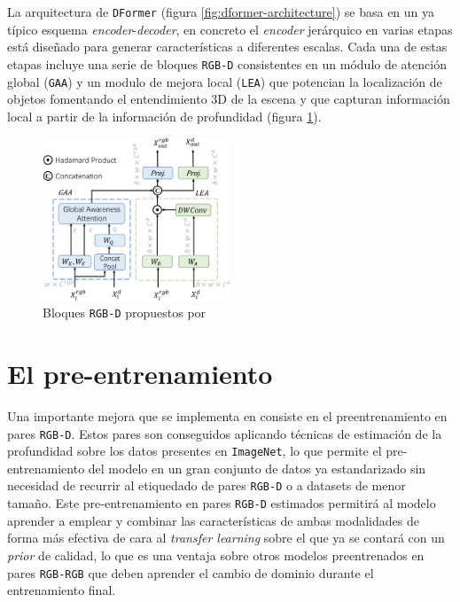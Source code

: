 \documentclass[12pt,a4paper]{report}
\begin{document}
La arquitectura de \texttt{DFormer} (figura \ref{fig:dformer-architecture}) se basa en un ya típico esquema \textit{encoder}-\textit{decoder}, en concreto el \textit{encoder} jerárquico en varias etapas está diseñado para generar características a diferentes escalas. Cada una de estas etapas incluye una serie de bloques \texttt{RGB-D} consistentes en un módulo de atención global (\texttt{GAA}) y un modulo de mejora local (\texttt{LEA}) que potencian la localización de objetos fomentando el entendimiento 3D de la escena y que capturan información local a partir de la información de profundidad (figura \ref{fig:dformer-blocks}).

\begin{figure}[!h]
    \centering
    \includegraphics[width=0.5\textwidth]{media/model/dformer_block.png}
    \caption{Bloques \texttt{RGB-D} propuestos por \cite{yin2024dformerrethinkingrgbdrepresentation}}
    \label{fig:dformer-blocks}
\end{figure}

\section{El pre-entrenamiento}
\label{sec:dformer_pretraining}
Una importante mejora que se implementa en \cite{yin2024dformerrethinkingrgbdrepresentation} consiste en el preentrenamiento en pares \texttt{RGB-D}. Estos pares son conseguidos aplicando técnicas de estimación de la profundidad sobre los datos presentes en \texttt{ImageNet}, lo que permite el pre-entrenamiento del modelo en un gran conjunto de datos ya estandarizado sin necesidad de recurrir al etiquedado de pares \texttt{RGB-D} o a datasets de menor tamaño. Este pre-entrenamiento en pares \texttt{RGB-D} estimados permitirá al modelo aprender a emplear y combinar las características de ambas modalidades de forma más efectiva de cara al \textit{transfer learning} sobre el que ya se contará con un \textit{prior} de calidad, lo que es una ventaja sobre otros modelos preentrenados en pares \texttt{RGB-RGB} que deben aprender el cambio de dominio durante el entrenamiento final.
\end{document}

